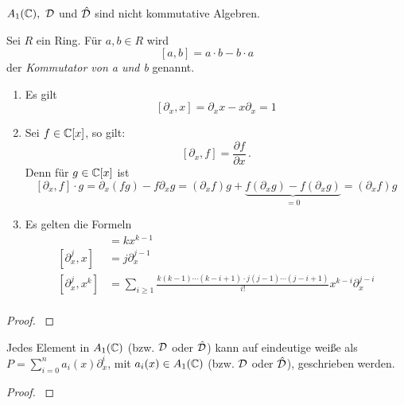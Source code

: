 \begin{rem}
  $A_1(\mathbb{C}),~\mathcal{D}$ und $\hat{\mathcal{D}}$ sind nicht kommutative Algebren.
\end{rem}

\begin{defn}[Kommutator]%
  Sei $R$ ein Ring. Für $a,b\in R$ wird
  \[[a,b]=a\cdot b-b\cdot a\]
  der \emph{Kommutator von a und b} genannt.
\end{defn}

\begin{prop} %
  \begin{enumerate}
    \item Es gilt
      \[[ \partial_x,x] = \partial_xx-x\partial_x=1 \]
    \item Sei $f\in \mathbb{C}[x]$, so gilt:
      \[ [\partial_x,f] = \frac{\partial f}{\partial x} \,. \]
      Denn für $g\in \mathbb{C}[x]$ ist
      \[
        [\partial_x,f]\cdot g=\partial_x(fg)-f\partial_xg=
        (\partial_xf)g+\underset{=0}{\underbrace{ 
            f(\partial_xg)-f(\partial_xg)}}=
        (\partial_xf)g
      \]
    \item Es gelten die Formeln\\
    \begin{align*}
      [\partial_x,x^k]   &= kx^{k-1}\\
      [\partial_x^j,x]   &= j\partial_x^{j-1}\\
      [\partial_x^j,x^k] &= \sum_{i\geq1}\frac{k(k-1)\cdots(k-i+1)
        \cdot j(j-1)\cdots(j-i+1)}{i!}x^{k-i}\partial_x^{j-i} \\
    \end{align*}
  \end{enumerate}
\end{prop}
\begin{proof}
  \cite{ZulaBarbara}
\end{proof}

\begin{prop} \label{prop:weyl_eindeutige_schreibung}
  Jedes Element in $A_1(\mathbb{C})$ (bzw. $\mathcal{D}$ oder $\hat{\mathcal{D}}$) kann auf eindeutige
  weiße als $P=\sum_{i=0}^na_i(x)\partial_x^i$, mit $a_i(x)\in A_1(\mathbb{C})$ (bzw.
  $\mathcal{D}$ oder $\hat{\mathcal{D}}$), geschrieben werden. 
\end{prop}
\begin{proof}
  \cite[Proposition 1.2.3]{sabbah_cimpa90}
  \begin{comment}
    ein teil des Beweises ist "left as an exersice"
  \end{comment}
\end{proof}

